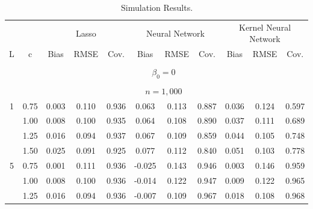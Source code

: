 \documentclass[lettersize, 12pt]{article}
\begin{document}
{\footnotesize
       \begin{table}
        \caption{\label{TDGP-High}Simulation Results.}
        \begin{center}
         \begin{tabular*}{0.9\textwidth}{@{}cc|ccc|ccc|ccc@{}}
                   \hline\hline
                   	\multicolumn{2}{c}{} 	      &\multicolumn{3}{c}{Lasso}  & \multicolumn{3}{c}{Neural Network} & \multicolumn{3}{c}{Kernel Neural Network}     \\[4pt]
	     L     & \multicolumn{1}{c}{c} & Bias  & RMSE   & \multicolumn{1}{c}{Cov.} 
	     & Bias  & RMSE   & \multicolumn{1}{c}{Cov.} 
	     & Bias  & RMSE  & Cov. \\
\hline
\hline
\\[-12pt]
		& \multicolumn{10}{c}{$\beta_0 = 0$} \\[2pt]
\hline
\\[-14pt]
    & \multicolumn{10}{c}{$n=1,000$} \\[2pt]  
           1       
          & 0.75  & 0.003 & 0.110 & 0.936 & 0.063 & 0.113 & 0.887 &	0.036	&	0.124	&	0.597\\
                 & 1.00  & 0.008 & 0.100 & 0.935 & 0.064 & 0.108 & 0.890&	0.037	&	0.111	&	0.689 \\
                 & 1.25  & 0.016 & 0.094 & 0.937 & 0.067 & 0.109 & 0.859 &	0.044	&	0.105	&	0.748\\
                 & 1.50  & 0.025 & 0.091 & 0.925 & 0.077 & 0.112 & 0.840 &	0.051	&	0.103	&	0.778\\
\hline
         5      & 0.75  & 0.001 & 0.111 & 0.936 & -0.025 & 0.143 & 0.946 &	0.003	&	0.146	&	0.959\\
                & 1.00  & 0.008 & 0.100 & 0.936 & -0.014 & 0.122 & 0.947 &	0.009	&	0.122	&	0.965\\
                 & 1.25  & 0.016 & 0.094 & 0.936 & -0.007 & 0.109 & 0.967 &	0.018	&	0.108	&	0.968\\

\end{tabular*}
\end{center}
\end{table}}
\end{document}
